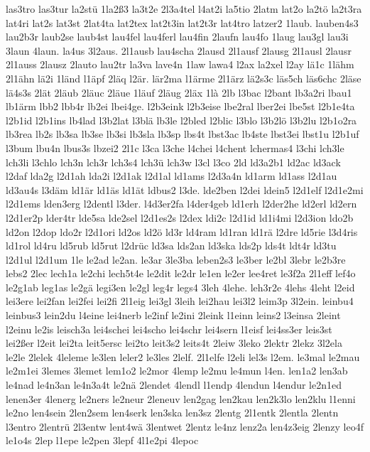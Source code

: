 {las3tro
las3tur
la2stü
1la2ß3
la3t2e
2l3a4tel
l4at2i
la5tio
2latm
lat2o
la2tö
la2t3ra
lat4ri
lat2s
lat3st
2lat4ta
lat2tex
lat2t3in
lat2t3r
lat4tro
latzer2
1laub.
lauben4s3
lau2b3r
laub2se
laub4st
lau4fel
lau4ferl
lau4fin
2laufn
lau4fo
1laug
lau3gl
lau3i
3laun
4laun.
la4us
3l2aus.
2l1ausb
lau4scha
2lausd
2l1ausf
2lausg
2l1ausl
2lausr
2l1auss
2lausz
2lauto
lau2tr
la3va
lave4n
1law
lawa4
l2ax
la2xel
l2ay
lä1c
1lähm
2l1ähn
lä2i
1länd
l1äpf
2läq
l2är.
lär2ma
l1ärme
2l1ärz
lä2s3c
läs5ch
läs6chc
2läse
lä4s3s
2lät
2läub
2läuc
2läue
1läuf
2läug
2läx
1là
2lb
l3bac
l2bant
lb3a2ri
lbau1
lb1ärm
lbb2
lbb4r
lb2ei
lbei4ge.
l2b3eink
l2b3eise
lbe2ral
lber2ei
lbe5st
l2b1e4ta
l2b1id
l2b1ins
lb4lad
l3b2lat
l3blä
lb3le
l2bled
l2blic
l3blo
l3b2lö
l3b2lu
l2b1o2ra
lb3rea
lb2s
lb3sa
lb3se
lb3si
lb3sla
lb3sp
lbs4t
lbst3ac
lb4ste
lbst3ei
lbst1u
l2b1uf
l3bum
lbu4n
lbus3s
lbzei2
2l1c
l3ca
l3che
l4chei
l4chent
lchermas4
l3chi
lch3le
lch3li
l3chlo
lch3n
lch3r
lch3s4
lch3ü
lch3w
l3cl
l3co
2ld
ld3a2b1
ld2ac
ld3ack
l2daf
lda2g
l2d1ah
lda2i
l2d1ak
l2d1al
ld1ams
l2d3a4n
ld1arm
ld1ass
l2d1au
ld3au4s
l3däm
ld1är
ld1äs
ld1ät
ldbus2
l3de.
lde2ben
l2dei
ldein5
l2d1elf
l2d1e2mi
l2d1ems
lden3erg
l2dentl
l3der.
l4d3er2fa
l4der4geb
ld1erh
l2der2he
ld2erl
ld2ern
l2d1er2p
lder4tr
lde5sa
lde2sel
l2d1es2s
l2dex
ldi2c
l2d1id
ld1i4mi
l2d3ion
ldo2b
ld2on
l2dop
ldo2r
l2d1ori
ld2os
ld2ö
ld3r
ld4ram
ld1ran
ld1rä
l2dre
ld5rie
l3d4ris
ld1rol
ld4ru
ld5rub
ld5rut
l2drüc
ld3sa
lds2an
ld3ska
lds2p
lds4t
ldt4r
ld3tu
l2d1ul
l2d1um
1le
le2ad
le2an.
le3ar
3le3ba
leben2s3
le3ber
le2bl
3lebr
le2b3re
lebs2
2lec
lech1a
le2chi
lech5t4e
le2dit
le2dr
le1en
le2er
lee4ret
le3f2a
2l1eff
lef4o
le2g1ab
leg1as
le2gä
legi3en
le2gl
leg4r
legs4
3leh
4lehe.
leh3r2e
4lehs
4leht
l2eid
lei3ere
lei2fan
lei2fei
lei2fi
2l1eig
lei3gl
3leih
lei2hau
lei3l2
leim3p
3l2ein.
leinbu4
leinbus3
lein2du
l4eine
lei4nerb
le2inf
le2ini
2leink
l1einn
leins2
l3einsa
2leint
l2einu
le2is
leisch3a
lei4schei
lei4scho
lei4schr
lei4sern
l1eisf
lei4ss3er
leis3st
lei2ßer
l2eit
lei2ta
leit5ersc
lei2to
leit3s2
leits4t
2leiw
3leko
2lektr
2lekz
3l2ela
le2le
2lelek
4leleme
le3len
leler2
le3les
2lelf.
2l1elfe
l2eli
lel3s
l2em.
le3mal
le2mau
le2m1ei
3lemes
3lemet
lem1o2
le2mor
4lemp
le2mu
le4mun
l4en.
len1a2
len3ab
le4nad
le4n3an
le4n3a4t
le2nä
2lendet
4lendl
l1endp
4lendun
l4endur
le2n1ed
lenen3er
4lenerg
le2ners
le2neur
2leneuv
len2gag
len2kau
len2k3lo
len2klu
l1enni
le2no
len4sein
2len2sem
len4serk
len3ska
len3sz
2lentg
2l1entk
2lentla
2lentn
l3entro
2lentrü
2l3entw
lent4wä
3lentwet
2lentz
le4nz
lenz2a
len4z3eig
2lenzy
leo4f
le1o4s
2lep
l1epe
le2pen
3lepf
4l1e2pi
4lepoc
}
